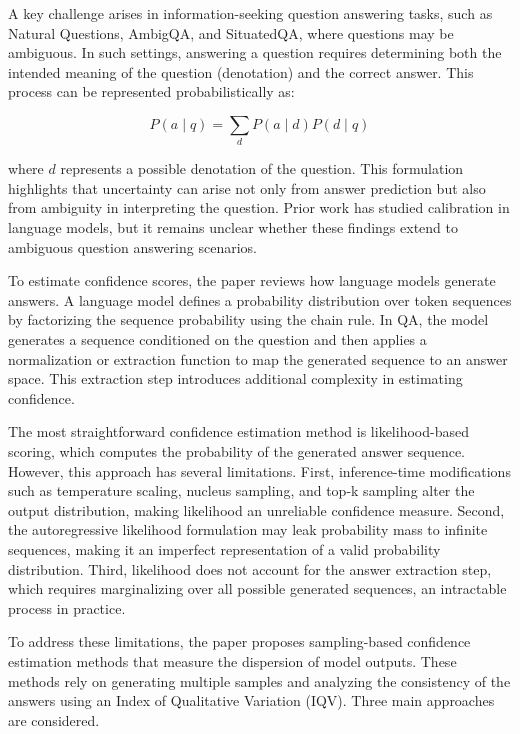 A key challenge arises in information-seeking question answering tasks, such as Natural Questions, AmbigQA, and SituatedQA, where questions may be ambiguous. In such settings, answering a question requires determining both the intended meaning of the question (denotation) and the correct answer. This process can be represented probabilistically as:

\begin{equation}
P(a \mid q) = \sum_d P(a \mid d) P(d \mid q)
\end{equation}

where $d$ represents a possible denotation of the question. This formulation highlights that uncertainty can arise not only from answer prediction but also from ambiguity in interpreting the question. Prior work has studied calibration in language models, but it remains unclear whether these findings extend to ambiguous question answering scenarios.

To estimate confidence scores, the paper reviews how language models generate answers. A language model defines a probability distribution over token sequences by factorizing the sequence probability using the chain rule. In QA, the model generates a sequence conditioned on the question and then applies a normalization or extraction function to map the generated sequence to an answer space. This extraction step introduces additional complexity in estimating confidence.

The most straightforward confidence estimation method is likelihood-based scoring, which computes the probability of the generated answer sequence. However, this approach has several limitations. First, inference-time modifications such as temperature scaling, nucleus sampling, and top-k sampling alter the output distribution, making likelihood an unreliable confidence measure. Second, the autoregressive likelihood formulation may leak probability mass to infinite sequences, making it an imperfect representation of a valid probability distribution. Third, likelihood does not account for the answer extraction step, which requires marginalizing over all possible generated sequences, an intractable process in practice.

To address these limitations, the paper proposes sampling-based confidence estimation methods that measure the dispersion of model outputs. These methods rely on generating multiple samples and analyzing the consistency of the answers using an Index of Qualitative Variation (IQV). Three main approaches are considered.

